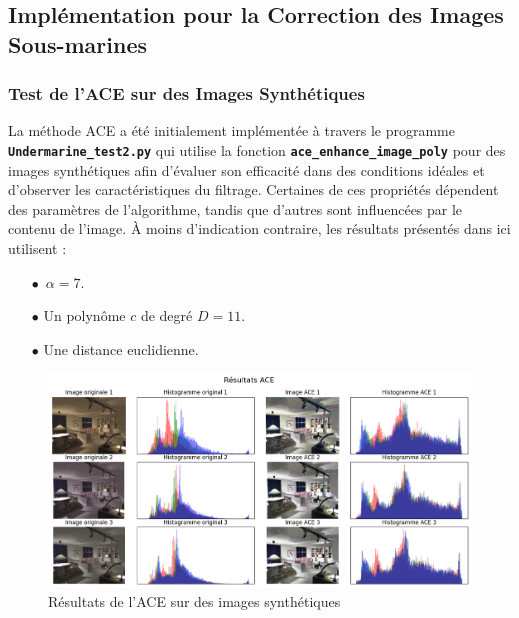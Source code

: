 \documentclass[10pt, a4paper]{extarticle}
\numberwithin{equation}{section}
\numberwithin{figure}{section}
\begin{document}
\subsection{Implémentation pour la Correction des Images Sous-marines}
\subsubsection{Test de l'ACE sur des Images Synthétiques}

\par La méthode ACE a été initialement implémentée à travers le programme \colorbox{gray!15}{\texttt{\textbf{Undermarine\_test2.py}}} qui utilise la fonction \colorbox{gray!15}{\texttt{\textbf{ace\_enhance\_image\_poly}}} pour des images synthétiques afin d'évaluer son efficacité dans des conditions idéales et d'observer les caractéristiques du filtrage. Certaines de ces propriétés dépendent des paramètres de l'algorithme, tandis que d'autres sont influencées par le contenu de l'image. À moins d'indication contraire, les résultats présentés dans ici utilisent :
\begin{itemize}
	\item[$\bullet$] $\,\alpha = 7$.
    \item[$\bullet$]  Un polynôme $c$ de degré $D = 11$. 
    \item[$\bullet$]  Une distance euclidienne.
\end{itemize}

\begin{figure}[h]
\begin{center}
\includegraphics[width=18cm]{image001.png}
\end{center}
\label{figure4.2}
\caption{Résultats de l'ACE sur des images synthétiques}
\end{figure} 
\end{document}
